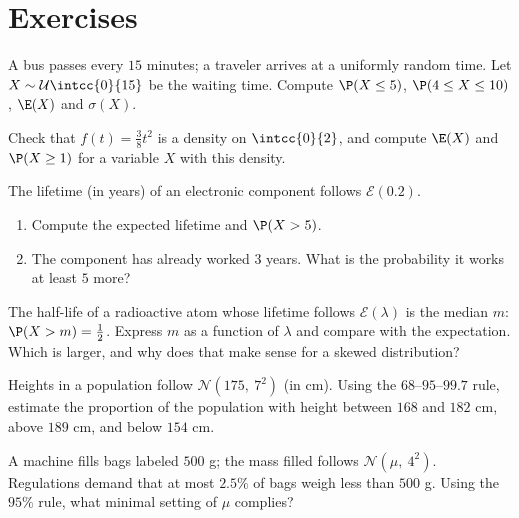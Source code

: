 \section{Exercises}

\begin{exercise}[$\star$]\label{exo:tle:contdist:1}
A bus passes every $15$ minutes; a traveler arrives at a uniformly random
time. Let $X \sim \mathcal U\intcc{0}{15}$ be the waiting time. Compute
$\P(X \leq 5)$, $\P(4 \leq X \leq 10)$, $\E(X)$ and $\sigma(X)$.
\end{exercise}

\begin{exercise}[$\star$]\label{exo:tle:contdist:2}
Check that $f(t) = \frac{3}{8}t^2$ is a density on $\intcc{0}{2}$, and
compute $\E(X)$ and $\P(X \geq 1)$ for a variable $X$ with this density.
\end{exercise}

\begin{exercise}[$\star$]\label{exo:tle:contdist:3}
The lifetime (in years) of an electronic component follows
$\mathcal E(0.2)$.
\begin{enumerate}
  \item Compute the expected lifetime and $\P(X > 5)$.
  \item The component has already worked $3$ years. What is the
        probability it works at least $5$ more?
\end{enumerate}
\end{exercise}

\begin{exercise}[$\star\star$]\label{exo:tle:contdist:4}
The half-life of a radioactive atom whose lifetime follows
$\mathcal E(\lambda)$ is the median $m$: $\P(X > m) = \frac12$. Express
$m$ as a function of $\lambda$ and compare with the expectation. Which is
larger, and why does that make sense for a skewed distribution?
\end{exercise}

\begin{exercise}[$\star\star$]\label{exo:tle:contdist:5}
Heights in a population follow $\mathcal N(175,\ 7^2)$ (in cm). Using the
$68$--$95$--$99.7$ rule, estimate the proportion of the population with
height between $168$ and $182$ cm, above $189$ cm, and below $154$ cm.
\end{exercise}

\begin{exercise}[$\star\star$]\label{exo:tle:contdist:6}
A machine fills bags labeled $500$ g; the mass filled follows
$\mathcal N(\mu,\ 4^2)$. Regulations demand that at most $2.5\%$ of bags
weigh less than $500$ g. Using the $95\%$ rule, what minimal setting of
$\mu$ complies?
\end{exercise}


